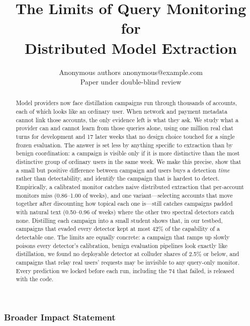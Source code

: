 \documentclass[10pt]{article} %
\title{The Limits of Query Monitoring for\\ Distributed Model Extraction}
\author{\name Anonymous authors \email anonymous@example.com \\
      \addr Paper under double-blind review}
\theoremstyle{definition}
\begin{document}
\maketitle

\begin{abstract}
Model providers now face distillation campaigns run through thousands of accounts, each of which looks like an ordinary user. When network and payment metadata cannot link those accounts, the only evidence left is what they ask. We study what a provider can and cannot learn from those queries alone, using one million real chat turns for development and 17 later weeks that no design choice touched for a single frozen evaluation. The answer is set less by anything specific to extraction than by benign coordination: a campaign is visible only if it is more distinctive than the most distinctive group of ordinary users in the same week. We make this precise, show that a small but positive difference between campaign and users buys a detection \emph{time} rather than detectability, and identify the campaign that is hardest to detect. Empirically, a calibrated monitor catches naive distributed extraction that per-account monitors miss (0.86--1.00 of weeks), and one variant---selecting accounts that move together after discounting how topical each one is---still catches campaigns padded with natural text (0.50--0.96 of weeks) where the other two spectral detectors catch none. Distilling each campaign into a small student shows that, in our testbed, campaigns that evaded every detector kept at most 42\% of the capability of a detectable one. The limits are equally concrete: a campaign that ramps up slowly poisons every detector's calibration, benign evaluation pipelines look exactly like distillation, we found no deployable detector at colluder shares of 2.5\% or below, and campaigns that relay real users' requests may be invisible to any query-only monitor. Every prediction we locked before each run, including the 74 that failed, is released with the code.
\end{abstract}














\subsubsection*{Broader Impact Statement}





\appendix

\end{document}
